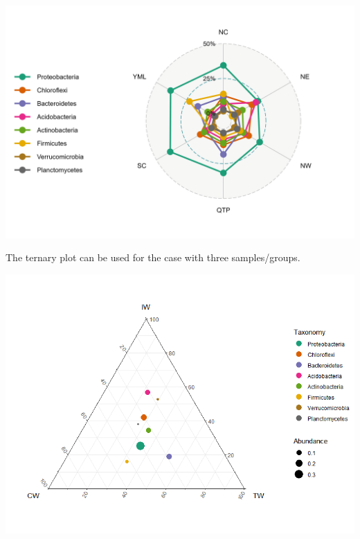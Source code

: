 \documentclass[
]{book}
\newenvironment{Shaded}{\begin{snugshade}}{\end{snugshade}}
\newcommand{\AttributeTok}[1]{\textcolor[rgb]{0.77,0.63,0.00}{#1}}
\newcommand{\DecValTok}[1]{\textcolor[rgb]{0.00,0.00,0.81}{#1}}
\newcommand{\FunctionTok}[1]{\textcolor[rgb]{0.00,0.00,0.00}{#1}}
\newcommand{\NormalTok}[1]{#1}
\newcommand{\OtherTok}[1]{\textcolor[rgb]{0.56,0.35,0.01}{#1}}
\newcommand{\SpecialCharTok}[1]{\textcolor[rgb]{0.00,0.00,0.00}{#1}}
\newcommand{\StringTok}[1]{\textcolor[rgb]{0.31,0.60,0.02}{#1}}
\begin{document}
\begin{center}\includegraphics[width=700px]{Images/trans_abund_radar} \end{center}

The ternary plot can be used for the case with three samples/groups.

\begin{Shaded}
\end{Shaded}

\begin{center}\includegraphics[width=600px]{Images/trans_abund_ternary} \end{center}
\end{document}
